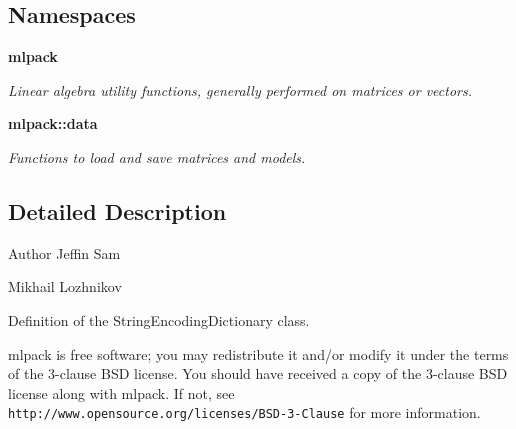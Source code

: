 \subsection*{Namespaces}
\begin{DoxyCompactItemize}
\item 
 \textbf{ mlpack}
\begin{DoxyCompactList}\small\item\em Linear algebra utility functions, generally performed on matrices or vectors. \end{DoxyCompactList}\item 
 \textbf{ mlpack\+::data}
\begin{DoxyCompactList}\small\item\em Functions to load and save matrices and models. \end{DoxyCompactList}\end{DoxyCompactItemize}


\subsection{Detailed Description}
\begin{DoxyAuthor}{Author}
Jeffin Sam 

Mikhail Lozhnikov
\end{DoxyAuthor}
Definition of the String\+Encoding\+Dictionary class.

mlpack is free software; you may redistribute it and/or modify it under the terms of the 3-\/clause B\+SD license. You should have received a copy of the 3-\/clause B\+SD license along with mlpack. If not, see {\tt http\+://www.\+opensource.\+org/licenses/\+B\+S\+D-\/3-\/\+Clause} for more information. 